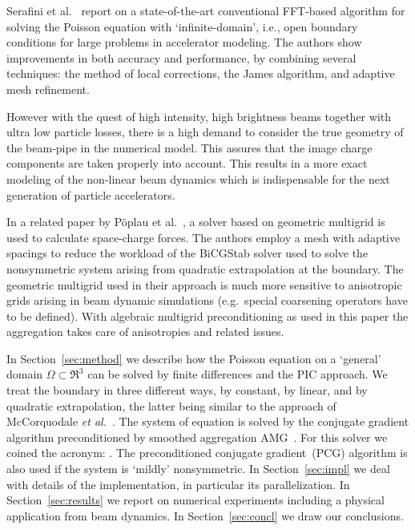 Serafini et al.~\cite{serafini_2005} report on a state-of-the-art
conventional FFT-based algorithm for solving the Poisson equation with
`infinite-domain', i.e., open boundary conditions for large problems in
accelerator modeling.  The authors show improvements in both accuracy
and performance, by combining several techniques: the method of local
corrections, the James algorithm, and adaptive mesh refinement.

However with the quest of high intensity, high brightness beams together
with ultra low particle losses, there is a high demand to consider the
true geometry of the beam-pipe in the numerical model. This assures that
the image charge components are taken properly into account. This
results in a more exact modeling of the non-linear beam dynamics which
is indispensable for the next generation of particle accelerators.

In a related paper by P{\"o}plau et
al.~\cite{poplau_self-adaptive_2008}, a solver based on geometric
multigrid is used to calculate space-charge forces.  The authors employ
a mesh with adaptive spacings to reduce the workload of the BiCGStab
solver used to solve the nonsymmetric system arising from quadratic
extrapolation at the boundary.  The geometric multigrid used in their
approach is much more sensitive to anisotropic grids arising in beam
dynamic simulations (e.g.\ special coarsening operators have to be
defined).  With algebraic multigrid preconditioning as used in this
paper the aggregation takes care of anisotropies and related issues.

In Section~\ref{sec:method} we describe how the Poisson equation on a
`general' domain $\Omega \subset \Re^3$ can be solved by finite
differences and the PIC approach.  We treat the boundary in three
different ways, by constant, by linear, and by quadratic extrapolation,
the latter being similar to the approach of McCorquodale \textit{et
  al.}~\cite{mcgv:04}.  The system of equation is solved by the
conjugate gradient algorithm preconditioned by smoothed aggregation
AMG~\cite{vamb:96a, tuto:00}. For this solver we coined the acronym: \oursolver.  The preconditioned conjugate
gradient~(PCG) algorithm is also used if the system is `mildly'
nonsymmetric.  In Section~\ref{sec:impl} we deal with details of the
implementation, in particular its parallelization.  In
Section~\ref{sec:results} we report on numerical experiments including a
physical application from beam dynamics.  In Section~\ref{sec:concl} we
draw our conclusions.

